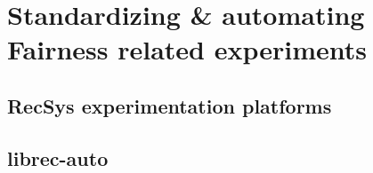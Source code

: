 
\chapter{Standardizing & automating Fairness related experiments}
\label{librec-auto}

\section{RecSys experimentation platforms}
\section{librec-auto}